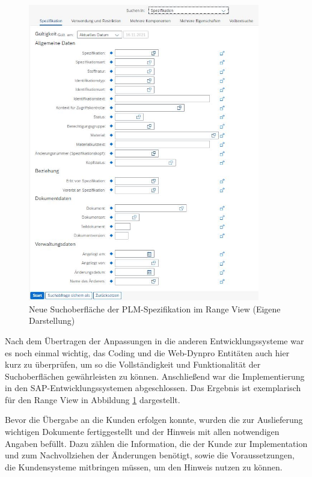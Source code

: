 \begin{figure}[htbp]
    \centering
    \includegraphics[width=0.9\textwidth]{img/LayoutRdanach2.jpg}
    \caption[Neue Suchoberfläche der PLM-Spezifikation im Range View]{Neue Suchoberfläche der PLM-Spezifikation im Range View (Eigene Darstellung)}
    \label{fig:Layoutfertig}
\end{figure}

Nach dem Übertragen der Anpassungen in die anderen Entwicklungssysteme war es noch einmal wichtig, das Coding und die Web-Dynpro Entitäten auch hier kurz zu überprüfen, um so die Vollständigkeit und Funktionalität der Suchoberflächen gewährleisten zu können. Anschließend war die Implementierung in den SAP-Entwicklungssystemen abgeschlossen. Das Ergebnis ist exemplarisch für den Range View in Abbildung \ref{fig:Layoutfertig} dargestellt.

Bevor die Übergabe an die Kunden erfolgen konnte, wurden die zur Auslieferung wichtigen Dokumente fertiggestellt und der Hinweis mit allen notwendigen Angaben befüllt. Dazu zählen die Information, die der Kunde zur Implementation und zum Nachvollziehen der Änderungen benötigt, sowie die Voraussetzungen, die Kundensysteme mitbringen müssen, um den Hinweis nutzen zu können.

